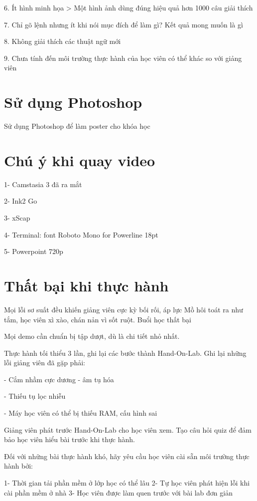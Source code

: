 6. Ít hình minh họa > Một hình ảnh dùng đúng hiệu quả hơn 1000 câu giải thích

7. Chỉ gõ lệnh nhưng ít khi nói mục đích để làm gì? Kết quả mong muốn là gì

8. Không giải thích các thuật ngữ mới

9. Chưa tính đến môi trường thực hành của học viên có thể khác so với giảng viên

\section{Sử dụng Photoshop}

Sử dụng Photoshop để làm poster cho khóa học

\section{Chú ý khi quay video}

1- Camstasia 3 đã ra mắt

2- Ink2 Go

3- xScap

4- Terminal: font Roboto Mono for Powerline 18pt

5- Powerpoint 720p

\section{Thất bại khi thực hành}

Mọi lỗi sơ suất đều khiến giảng viên cực kỳ bối rối, áp lực
Mồ hôi toát ra như tắm, học viên xì xào, chán nản vì sốt ruột. Buổi học thất bại

Mọi demo cần chuẩn bị tập dượt, dù là chi tiết nhỏ nhất.

Thực hành tối thiểu 3 lần, ghi lại các bước thành Hand-On-Lab.
Ghi lại những lỗi giảng viên đã gặp phải:

- Cắm nhầm cực dương - âm tụ hóa

- Thiếu tụ lọc nhiễu

- Máy học viên có thể bị thiếu RAM, cấu hình sai

Giảng viên phát trước Hand-On-Lab cho học viên xem. Tạo câu hỏi quiz để đảm bảo học viên hiểu bài trước khi thực hành.

Đối với những bài thực hành khó, hãy yêu cầu học viên cài sẵn môi trường thực hành bởi:

1- Thời gian tải phần mềm ở lớp học có thể lâu
2- Tự học viên phát hiện lỗi khi cài phần mềm ở nhà
3- Học viên được làm quen trước với bài lab đơn giản

